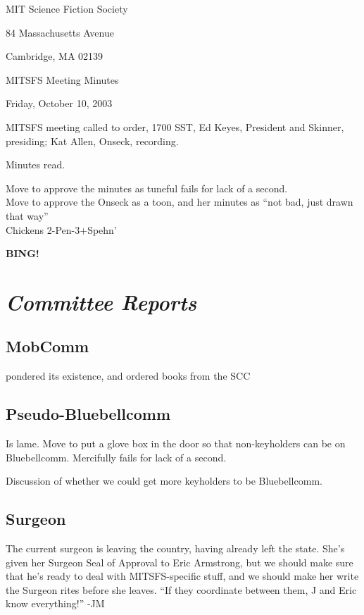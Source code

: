 \documentclass[10pt]{article}
\newcommand{\bing}{{\bf BING!} }
\newcommand{\goto}[1]{\bing \vskip 12pt \section*{{\em{#1}}}}
\begin{document}
\begin{center}

MIT Science Fiction Society 

84 Massachusetts Avenue

Cambridge, MA 02139

\vspace{12pt}

MITSFS Meeting Minutes 

Friday, October 10, 2003

\end{center}
 
\vspace{18pt}

\setlength{\parskip}{6pt}

\noindent
MITSFS meeting called to order, 1700 SST, Ed Keyes, President and
Skinner, presiding; Kat Allen,  Onseck, recording.

Minutes read.

Move to approve the minutes as tuneful fails for lack of a second.\\
Move to approve the Onseck as a toon, and her minutes as ``not bad,
just drawn that way''\\
Chickens 2-Pen-3+Spehn'

\goto{Committee Reports}
\subsection*{MobComm}
pondered its existence, and ordered books from the SCC

\subsection*{Pseudo-Bluebellcomm}
Is lame. 
Move to put a glove box in the door so that non-keyholders can be on
Bluebellcomm.
Mercifully fails for lack of a second.

Discussion of whether we could get more keyholders to be Bluebellcomm.
\subsection*{Surgeon}
The current surgeon is leaving the country, having already left the
state. She's given her Surgeon Seal of Approval to Eric Armstrong, but
we should make sure that he's ready to deal with MITSFS-specific
stuff, and we should make her write the Surgeon rites before she leaves.
``If they coordinate between them, J and Eric know everything!'' -JM
\end{document}
